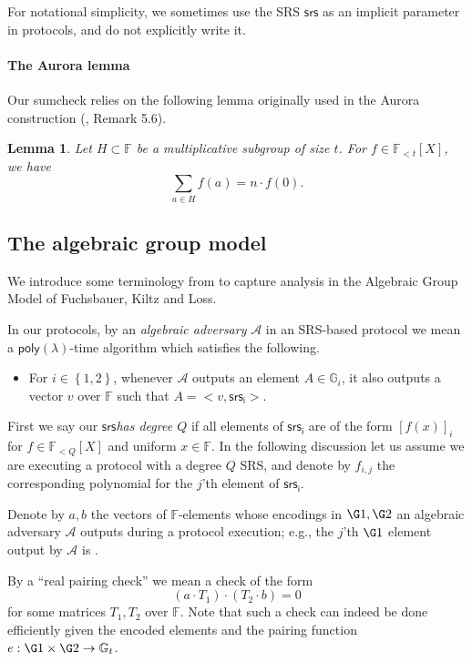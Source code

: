 \documentclass[11pt]{article} %
\newcommand{\Gi}{\ensuremath{{\mathbb G}_i}\xspace}
\newcommand{\Gt}{\ensuremath{{\mathbb G}_t}\xspace}
\newcommand{\F}{\ensuremath{\mathbb F}\xspace}
\newcommand{\adv}{\ensuremath{\mathcal A}\xspace}
\newcommand{\srs}{\ensuremath{\mathsf{srs}}\xspace}
\newcommand{\srsi}{\ensuremath{\mathsf{srs_i}}\xspace}
\newcommand{\enci}[1]{\ensuremath{\left[#1\right]_i}\xspace}
\newcommand{\set}[1]{\ensuremath{\left\{#1\right\}}\xspace}
\newcommand{\polysofdeg}[1]{\ensuremath{\F_{< #1}[X]}\xspace}
\newtheorem{lemma}{Lemma}[section]
\newcommand{\poly}{\ensuremath{\mathsf{poly(\lambda)}}\xspace}
\begin{document}
For notational simplicity, we sometimes use the SRS \srs as an implicit parameter in protocols, and do not explicitly write it.


\paragraph{The Aurora lemma}
Our sumcheck relies on the following lemma originally used in the Aurora construction (\cite{aurora}, Remark 5.6).
\begin{lemma}\label{lem:aurora}
 Let $H\subset \F$ be a multiplicative subgroup of size $t$.
 For $f\in\polysofdeg{t}$, we have 
\[\sum_{a\in H}f(a) = n\cdot f(0).\]
\end{lemma}



\subsection{The algebraic group model}\label{subsec:agm}
We introduce some terminology from \cite{plonk} to capture analysis in the Algebraic Group Model of Fuchsbauer, Kiltz and Loss\cite{AGM}.

In our protocols, by an \emph{algebraic adversary} \adv in an SRS-based protocol we mean a \poly-time algorithm which satisfies the following.
\begin{itemize}
 \item For $i\in \set{1,2}$, whenever \adv outputs an element $A\in \Gi$, it also outputs a vector $v$ over \F such that $A = <v,\srsi>$.
\end{itemize}

First we say our \srs \emph{has degree $Q$} if all elements of \srsi are of the form  \enci{f(x)} for $f\in \polysofdeg{Q}$ and uniform $x\in \F$. In the following discussion let us assume we are executing a protocol with a degree $Q$ SRS, and denote by $f_{i,j}$ the corresponding polynomial for the $j$'th element of \srsi.

Denote by $a,b$ the vectors of $\F$-elements whose encodings in $\G1,\G2$ an algebraic adversary \adv outputs during a protocol execution; e.g., the $j$'th $\G1$ element output by \adv is .

By a ``real pairing check'' we mean a check of the form
\[(a\cdot T_1) \cdot (T_2\cdot b)=0\]
for some matrices $T_1,T_2$ over $\F$.
Note that such a check can indeed be done efficiently given the encoded elements and the pairing function $e:\G1\times \G2\to \Gt$.
\end{document}
